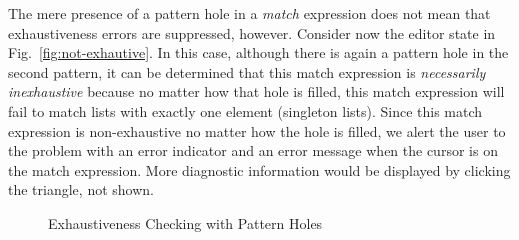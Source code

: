 The mere presence of a pattern hole in a \emph{match} 
expression does not mean that exhaustiveness errors are suppressed, however. Consider now
the editor state in Fig.~\ref{fig:not-exhautive}. In this case,
although there is again a pattern hole in the second pattern, 
it can be determined that this match expression is \emph{necessarily inexhaustive}
because no matter how that hole is filled, this match expression will fail to 
match lists with exactly one element (singleton lists). Since this match expression is non-exhaustive no matter how the hole is filled,
we alert the user to the problem with an error indicator and an error message when the cursor is on the match expression. More diagnostic information would be displayed by clicking the triangle, not shown.

\begin{figure}
  \centering
\hfill
  \caption{Exhaustiveness Checking with Pattern Holes}
  \label{fig:exhaustiveness}
\end{figure}

